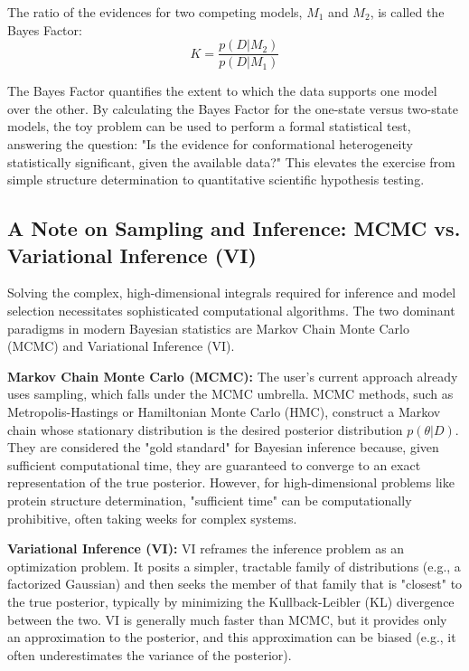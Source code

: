 \documentclass{article}
\begin{document}
The ratio of the evidences for two competing models, $M_1$ and $M_2$, is called the Bayes Factor:
\[ K = \frac{p(D | M_2)}{p(D | M_1)} \]

The Bayes Factor quantifies the extent to which the data supports one model over the other. By calculating the Bayes Factor for the one-state versus two-state models, the toy problem can be used to perform a formal statistical test, answering the question: "Is the evidence for conformational heterogeneity statistically significant, given the available data?" This elevates the exercise from simple structure determination to quantitative scientific hypothesis testing.

\subsection{A Note on Sampling and Inference: MCMC vs. Variational Inference (VI)}

Solving the complex, high-dimensional integrals required for inference and model selection necessitates sophisticated computational algorithms. The two dominant paradigms in modern Bayesian statistics are Markov Chain Monte Carlo (MCMC) and Variational Inference (VI).

\textbf{Markov Chain Monte Carlo (MCMC):} The user's current approach already uses sampling, which falls under the MCMC umbrella. MCMC methods, such as Metropolis-Hastings or Hamiltonian Monte Carlo (HMC), construct a Markov chain whose stationary distribution is the desired posterior distribution $p(\theta|D)$.\cite{ref44} They are considered the "gold standard" for Bayesian inference because, given sufficient computational time, they are guaranteed to converge to an exact representation of the true posterior.\cite{ref45} However, for high-dimensional problems like protein structure determination, "sufficient time" can be computationally prohibitive, often taking weeks for complex systems.\cite{ref46}

\textbf{Variational Inference (VI):} VI reframes the inference problem as an optimization problem. It posits a simpler, tractable family of distributions (e.g., a factorized Gaussian) and then seeks the member of that family that is "closest" to the true posterior, typically by minimizing the Kullback-Leibler (KL) divergence between the two.\cite{ref40} VI is generally much faster than MCMC, but it provides only an approximation to the posterior, and this approximation can be biased (e.g., it often underestimates the variance of the posterior).\cite{ref45}
\end{document}
